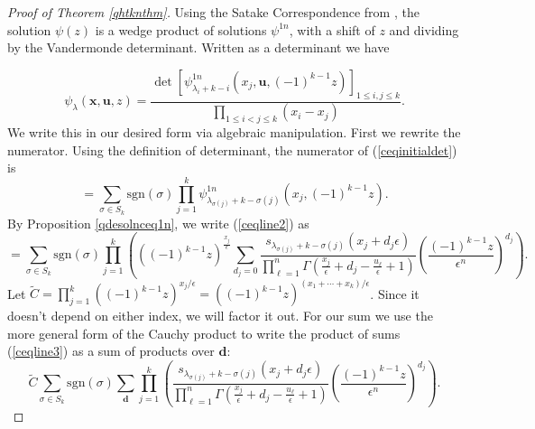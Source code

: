 \documentclass[12pt]{article}
\theoremstyle{plain}
\theoremstyle{definition}
\newcommand{\xb}{\boldsymbol{x}}
\newcommand{\db}{\boldsymbol{d}}
\newcommand{\ub}{\boldsymbol{u}}
\begin{document}
\begin{proof}[Proof of Theorem \ref{qhtknthm}]
Using the Satake Correspondence from \cite{cotti2024satakecorrespondenceequivariantquantum}, the solution $\psi  (z)$ is a wedge product of solutions $\psi^{1n}$, with a shift of $z$ and dividing by the Vandermonde determinant. Written as a determinant we have 

\begin{equation}\label{ceqinitialdet}
    \psi_\lambda(\xb, \ub, z) = \frac{\det \left[ \psi^{1n}_{\lambda_i+k-i} \left(x_j, \ub, (-1)^{k-1} z\right) \right]_{1\leq i,j \leq k}}{\prod_{1\leq i<j \leq k} (x_i-x_j)}.
\end{equation}
We write this in our desired form via algebraic manipulation. First we rewrite the numerator. Using the definition of determinant, the numerator of (\ref{ceqinitialdet}) is
\begin{equation}\label{ceqline2}
    =\sum_{\sigma \in S_k} \mathrm{sgn}(\sigma) \prod_{j=1} ^k \psi^{1n}_{\lambda_{\sigma(j)}+k-{\sigma(j)}} \left(x_j, (-1)^{k-1} z\right).
\end{equation}
By Proposition \ref{qdesolnceq1n}, we write (\ref{ceqline2}) as 
\begin{equation}\label{ceqline3}
    =\sum_{\sigma \in S_k} \mathrm{sgn}(\sigma) \prod_{j=1} ^k \left(((-1)^{k-1}z)^{\frac{x_j}{\epsilon}}\sum_{d_j=0} \frac{s_{\lambda_{\sigma(j)}+k-{\sigma(j)}} (x_j+d_j \epsilon)}{ \prod_{\ell=1} ^n \Gamma \left(\frac{x_j}{\epsilon}+d_j- \frac{u_\ell}{\epsilon}+1\right)}  \left(\frac{(-1)^{k-1} z}{\epsilon^n}\right)^{d_j}  \right).
\end{equation}
Let $\widetilde{C} = \prod_{j=1} ^k ((-1)^{k-1} z)^{x_j/\epsilon}= ((-1)^{k-1}z)^{(x_1+\cdots + x_k)/\epsilon}$. Since it doesn't depend on either index, we will factor it out. For our sum we use the more general form of the Cauchy product to write the product of sums (\ref{ceqline3}) as a sum of products over $\db$:
\begin{equation}
    \widetilde{C}\sum_{\sigma \in S_k} \mathrm{sgn}(\sigma) \sum_{\db} \prod_{j=1} ^k \left(\frac{s_{\lambda_{\sigma(j)}+k-{\sigma(j)}} (x_j+d_j \epsilon)}{ \prod_{\ell=1} ^n \Gamma \left(\frac{x_j}{\epsilon}+d_j- \frac{u_\ell}{\epsilon}+1\right)}  \left(\frac{(-1)^{k-1} z}{\epsilon^n}\right)^{d_j}  \right).
\end{equation}


\end{proof}
\end{document}
